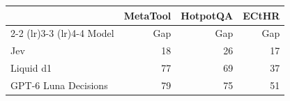 \begin{tabular}{lrrr}
\toprule
 & \multicolumn{1}{c}{MetaTool} & \multicolumn{1}{c}{HotpotQA} & \multicolumn{1}{c}{ECtHR} \\
\cmidrule(lr){2-2} \cmidrule(lr){3-3} \cmidrule(lr){4-4}
Model & Gap & Gap & Gap \\
\midrule
Jev & 18 & 26 & 17 \\
Liquid d1 & 77 & 69 & 37 \\
GPT-6 Luna Decisions & 79 & 75 & 51 \\
\bottomrule
\end{tabular}
